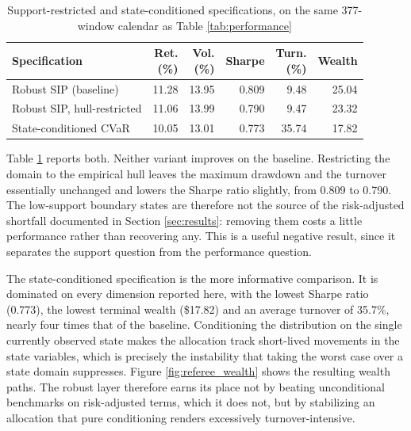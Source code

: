 \documentclass[smallextended]{svjour3}
\begin{document}
\begin{table}[htbp]
\centering
\caption{Support-restricted and state-conditioned specifications, on the same
377-window calendar as Table \ref{tab:performance}}
\label{tab:referee_benchmarks}
\small
\begin{tabular}{lrrrrr}
\toprule
\textbf{Specification} & \makecell[r]{\textbf{Ret.}\\\textbf{(\%)}} & \makecell[r]{\textbf{Vol.}\\\textbf{(\%)}} & \textbf{Sharpe} & \makecell[r]{\textbf{Turn.}\\\textbf{(\%)}} & \textbf{Wealth} \\
\midrule
Robust SIP (baseline) & 11.28 & 13.95 & 0.809 & 9.48 & 25.04 \\
Robust SIP, hull-restricted & 11.06 & 13.99 & 0.790 & 9.47 & 23.32 \\
State-conditioned CVaR & 10.05 & 13.01 & 0.773 & 35.74 & 17.82 \\
\bottomrule
\end{tabular}
\end{table}

Table \ref{tab:referee_benchmarks} reports both. Neither variant improves on the baseline. Restricting the domain to the
empirical hull leaves the maximum drawdown and the turnover essentially
unchanged and lowers the Sharpe ratio slightly, from 0.809 to 0.790. The
low-support boundary states are therefore not the source of the risk-adjusted
shortfall documented in Section \ref{sec:results}: removing them costs a little
performance rather than recovering any. This is a useful negative result, since
it separates the support question from the performance question.

The state-conditioned specification is the more informative comparison. It is
dominated on every dimension reported here, with the lowest Sharpe ratio
(0.773), the lowest terminal wealth (\$17.82) and an average turnover of
35.7\%, nearly four times that of the baseline. Conditioning the distribution on
the single currently observed state makes the allocation track short-lived
movements in the state variables, which is precisely the instability that taking
the worst case over a state domain suppresses. Figure \ref{fig:referee_wealth}
shows the resulting wealth paths. The robust layer therefore earns its place not
by beating unconditional benchmarks on risk-adjusted terms, which it does not,
but by stabilizing an allocation that pure conditioning renders excessively
turnover-intensive.
\end{document}
